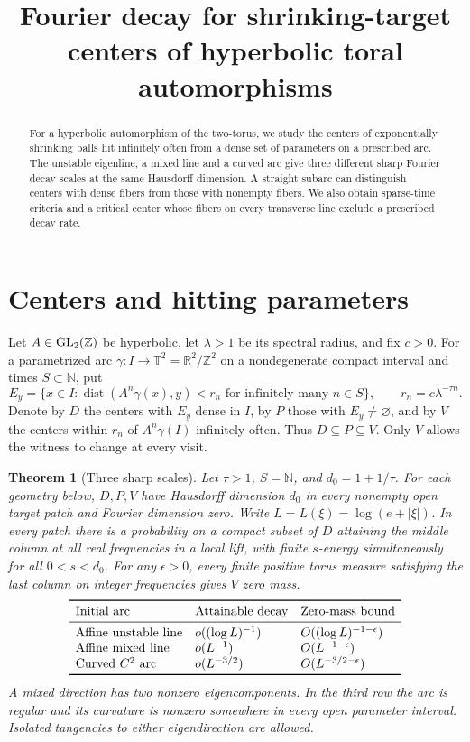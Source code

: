 \documentclass[11pt,a4paper,reqno]{amsart}
\title[Fourier decay for shrinking-target centers]{Fourier decay for shrinking-target centers of hyperbolic toral automorphisms}
\date{}
\newtheorem{theorem}{Theorem}[section]
\theoremstyle{definition}
\theoremstyle{remark}
\numberwithin{equation}{section}
\begin{document}
\begin{abstract}
For a hyperbolic automorphism of the two-torus, we study the centers of
exponentially shrinking balls hit infinitely often from a dense set of
parameters on a prescribed arc. The unstable eigenline, a mixed line and
a curved arc give three different sharp Fourier decay scales at the same
Hausdorff dimension. A straight subarc can distinguish centers with dense
fibers from those with nonempty fibers. We also obtain sparse-time criteria
and a critical center whose fibers on every transverse line exclude a
prescribed decay rate.
\end{abstract}
\maketitle

\section{Centers and hitting parameters}\label{sec:intro}
Let \(A\in{\rm GL}_2(\mathbb Z)\) be hyperbolic, let \(\lambda>1\) be its
spectral radius, and fix \(c>0\). For a parametrized arc
\(\gamma:I\to\mathbb T^2=\mathbb R^2/\mathbb Z^2\) on a nondegenerate
compact interval and times \(S\subset\mathbb N\), put
\[
 E_y=\{x\in I:\operatorname{dist}(A^n\gamma(x),y)<r_n
                  \text{ for infinitely many } n\in S\},
 \qquad r_n=c\lambda^{-\tau n}.
\]
Denote by \(D\) the centers with \(E_y\) dense in \(I\), by \(P\) those with
\(E_y\ne\varnothing\), and by \(V\) the centers within \(r_n\) of
\(A^n\gamma(I)\) infinitely often. Thus \(D\subseteq P\subseteq V\).
Only \(V\) allows the witness to change at every visit.

\begin{theorem}[Three sharp scales]\label{thm:planar}
Let \(\tau>1\), \(S=\mathbb N\), and \(d_0=1+1/\tau\).
For each geometry below, \(D,P,V\) have Hausdorff dimension \(d_0\) in
every nonempty open target patch and Fourier dimension zero. Write \(L=L(\xi)=
\log(e+|\xi|)\). In every patch there is a probability on a compact
subset of \(D\) attaining the middle column at all real frequencies in a
local lift, with finite \(s\)-energy simultaneously for all \(0<s<d_0\).
For any \(\epsilon>0\), every finite positive torus measure satisfying the
last column on integer frequencies gives \(V\) zero mass.
\[
\begin{array}{lll}
\toprule
\text{Initial arc} & \text{Attainable decay} & \text{Zero-mass bound}\\
\midrule
\text{Affine unstable line} & o((\log L)^{-1}) & O((\log L)^{-1-\epsilon})\\
\text{Affine mixed line} & o(L^{-1}) & O(L^{-1-\epsilon})\\
\text{Curved } C^2\text{ arc} & o(L^{-3/2}) & O(L^{-3/2-\epsilon})\\
\bottomrule
\end{array}
\]
A mixed direction has two nonzero eigencomponents. In the third row the
arc is regular and its curvature is nonzero somewhere in every open
parameter interval. Isolated tangencies to either eigendirection are allowed.
\end{theorem}
\end{document}
